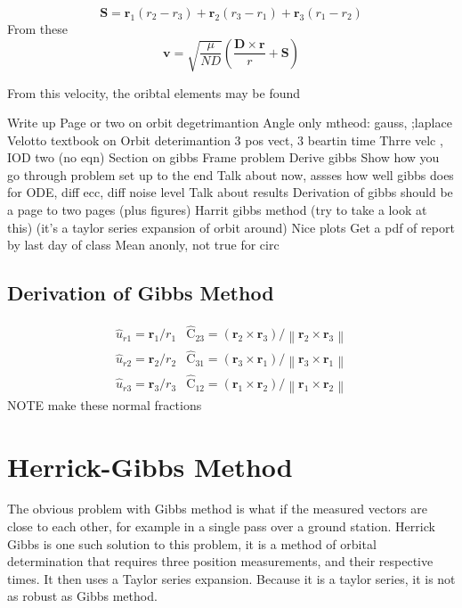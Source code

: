 \documentclass[12pt]{article}
\begin{document}
	\begin{equation}
	\mathbf { S } = \mathbf { r } _ { 1 } \left( r _ { 2 } - r _ { 3 } \right) + \mathbf { r } _ { 2 } \left( r _ { 3 } - r _ { 1 } \right) + \mathbf { r } _ { 3 } \left( r _ { 1 } - r _ { 2 } \right)
	\end{equation}
	From these
	\begin{equation}
	\mathbf { v } = \sqrt { \frac { \mu } { N D } } \left( \frac { \mathbf { D } \times \mathbf { r } } { r } + \mathbf { S } \right)
	\end{equation}
	
	From this velocity, the oribtal elements may be found
	
	
	Write up
	Page or two on orbit degetrimantion
	Angle only mtheod: gauss, ;laplace
	Velotto textbook on Orbit deterimantion
	3 pos vect, 3 beartin time
	Thrre velc , IOD two
	(no eqn)
	Section on gibbs
	Frame problem
	Derive gibbs
	Show how you go through problem set up to the end
	Talk about now, assses how well gibbs does for ODE, diff ecc, diff noise level
	Talk about results
	Derivation of gibbs should be a page to two pages (plus figures)
	Harrit gibbs method (try to take a look at this) (it’s a taylor series expansion of orbit around)
	Nice plots
	Get a pdf of report by last day of class
	Mean  anonly, not true for circ
	
	
	\subsection{Derivation of Gibbs Method}
	\begin{eqnarray}
	\hat { { u } } _ { r 1 } = \mathbf { r } _ { 1 } / r _ { 1 }& \hat { \mathrm { C } } _ { 23 } = \left( \mathbf { r } _ { 2 } \times \mathbf { r } _ { 3 } \right) / \left\| \mathbf { r } _ { 2 } \times \mathbf { r } _ { 3 } \right\|\\
	\hat {{ u } } _ { r 2 } = \mathbf { r } _ { 2 } / r _ { 2 }&\hat { \mathrm { C } } _ { 31 } = \left( \mathbf { r } _ { 3 } \times \mathbf { r } _ { 1} \right) / \left\| \mathbf { r } _ { 3 } \times \mathbf { r } _ { 1 } \right\|\\
		\hat {{ u } } _ { r 3 } = \mathbf { r } _ { 3 } / r _ { 3} & \hat { \mathrm { C } } _ { 12 } = \left( \mathbf { r } _ { 1 } \times \mathbf { r } _ { 2 } \right) / \left\| \mathbf { r } _ { 1} \times \mathbf { r } _ { 2 } \right\|
	\end{eqnarray}
	NOTE make these normal fractions
	\fi
	\section{Herrick-Gibbs Method}
	The obvious problem with Gibbs method is what if the measured vectors are close to each other, for example in a single pass over a ground station. Herrick Gibbs is one such solution to this problem, it is a method of orbital determination that requires three position measurements, and their respective times. It then uses a Taylor series expansion. Because it is a taylor series, it is not as robust as Gibbs method.
	
\end{document}

